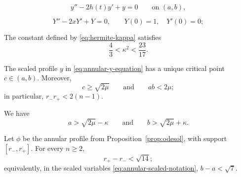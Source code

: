 \documentclass[10pt,a4paper]{amsart}
\begin{document}
\begin{equation}\label{eq:annular-y-equation}
    y''-2h(t)y'+y=0
    \qquad\text{on }(a,b),\tag{D}
\end{equation}

\begin{equation}\label{eq:hermite-kappa}
    Y''-2xY'+Y=0,
    \qquad
    Y(0)=1,\quad Y'(0)=0;\tag{H}
\end{equation}

\begin{lemma}\label{lem:kappa-bounds}
The constant defined by \eqref{eq:hermite-kappa} satisfies
\begin{equation}\label{eq:kappa-bounds}
    \frac43<\kappa^2<\frac{23}{17}.
\end{equation}
\end{lemma}

\begin{lemma}\label{lem:annular-phase}
The scaled profile $y$ in \eqref{eq:annular-y-equation} has a unique critical point $c\in(a,b)$. Moreover,
\[
    c\geq\sqrt{2\mu}
    \qquad\text{and}\qquad
    ab<2\mu;
\]
in particular, $r_-r_+<2(n-1)$.
\end{lemma}

\begin{lemma}\label{lem:annular-barrier}
We have
\[
    a>\sqrt{2\mu}-\kappa
    \qquad\text{and}\qquad
    b>\sqrt{2\mu}+\kappa.
\]
\end{lemma}

\begin{proposition}\label{prop:annulus-width}
Let $\phi$ be the annular profile from Proposition~\ref{prop:odesol}, with support $[r_-,r_+]$. For every $n\geq2$,
\[
    r_+-r_-<\sqrt{14};
\]
equivalently, in the scaled variables \eqref{eq:annular-scaled-notation}, $b-a<\sqrt7$.
\end{proposition}
\end{document}
